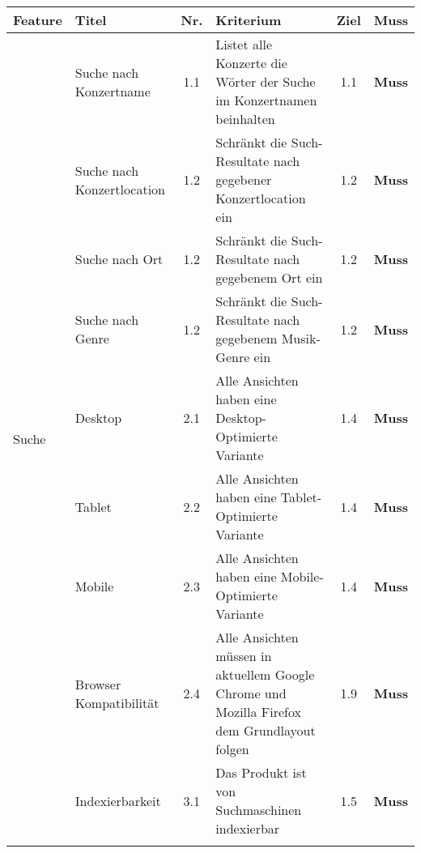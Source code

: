 \begin{longtable}[]{@{}p{1.9cm}p{2.5cm}cp{5.5cm}cc@{}}
  \toprule
  Feature                    & Titel                      & Nr. & Kriterium                                                                                                   & Ziel & Muss\tabularnewline
  \midrule
  \endhead
  \multirow{10}{*}{Suche}    & Suche nach Konzertname     & 1.1 & Listet alle Konzerte die Wörter der Suche im Konzertnamen beinhalten                                        & 1.1  & \textbf{Muss}       \\ \cline{2-6}
                             & Suche nach Konzertlocation & 1.2 & Schränkt die Such-Resultate nach gegebener Konzertlocation ein                                              & 1.2  & \textbf{Muss}       \\ \cline{2-6}
                             & Suche nach Ort             & 1.2 & Schränkt die Such-Resultate nach gegebenem Ort ein                                                          & 1.2  & \textbf{Muss}       \\ \cline{2-6}
                             & Suche nach Genre           & 1.2 & Schränkt die Such-Resultate nach gegebenem Musik-Genre ein                                                  & 1.2  & \textbf{Muss}       \\
  \midrule
  \multirow{8}{*}{Design}    & Desktop                    & 2.1 & Alle Ansichten haben eine Desktop-Optimierte Variante                                                       & 1.4  & \textbf{Muss}       \\ \cline{2-6}
                             & Tablet                     & 2.2 & Alle Ansichten haben eine Tablet-Optimierte Variante                                                        & 1.4  & \textbf{Muss}       \\ \cline{2-6}
                             & Mobile                     & 2.3 & Alle Ansichten haben eine Mobile-Optimierte Variante                                                        & 1.4  & \textbf{Muss}       \\ \cline{2-6}
                             & Browser Kompatibilität     & 2.4 & Alle Ansichten müssen in aktuellem Google Chrome und Mozilla Firefox dem Grundlayout folgen                 & 1.9  & \textbf{Muss}       \\
  \midrule
  \multirow{4}{*}{SEO}       & Indexierbarkeit            & 3.1 & Das Produkt ist von Suchmaschinen indexierbar                                                               & 1.5  & \textbf{Muss}       \\ \cline{2-6}

\end{longtable}
